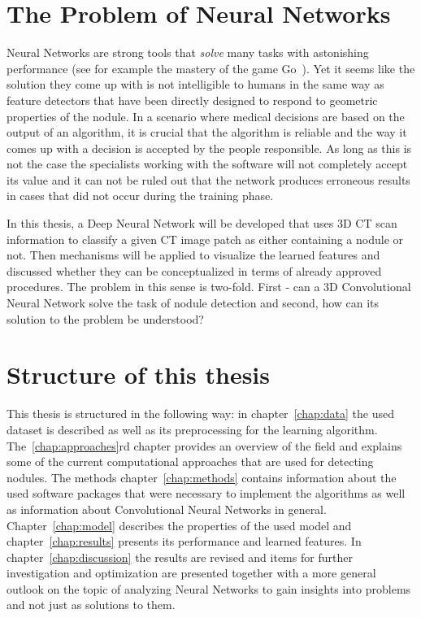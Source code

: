 \documentclass[main.tex]{subfiles}
\begin{document}
\section{The Problem of Neural Networks}
Neural Networks are strong tools that \emph{solve} many tasks with astonishing performance (see for example the mastery of the game Go~\cite{silver2017alphagozero}). Yet it seems like the solution they come up with is not intelligible to humans in the same way as feature detectors that have been directly designed to respond to geometric properties of the nodule. In a scenario where medical decisions are based on the output of an algorithm, it is crucial that the algorithm is reliable and the way it comes up with a decision is accepted by the people responsible. As long as this is not the case the specialists working with the software will not completely accept its value and it can not be ruled out that the network produces erroneous results in cases that did not occur during the training phase.

In this thesis, a Deep Neural Network will be developed that uses 3D CT scan information to classify a given CT image patch as either containing a nodule or not. Then mechanisms will be applied to visualize the learned features and discussed whether they can be conceptualized in terms of already approved procedures. The problem in this sense is two-fold. First - can a 3D Convolutional Neural Network solve the task of nodule detection and second, how can its solution to the problem be understood? 


\section{Structure of this thesis}
This thesis is structured in the following way: in chapter~\ref{chap:data} the used dataset is described as well as its preprocessing for the learning algorithm. The~\ref{chap:approaches}rd chapter provides an overview of the field and explains some of the current computational approaches that are used for detecting nodules. The methods chapter~\ref{chap:methods} contains information about the used software packages that were necessary to implement the algorithms as well as information about Convolutional Neural Networks in general. Chapter~\ref{chap:model} describes the properties of the used model and chapter~\ref{chap:results} presents its performance and learned features. In chapter~\ref{chap:discussion} the results are revised and items for further investigation and optimization are presented together with a more general outlook on the topic of analyzing Neural Networks to gain insights into problems and not just as solutions to them. 
\end{document}
